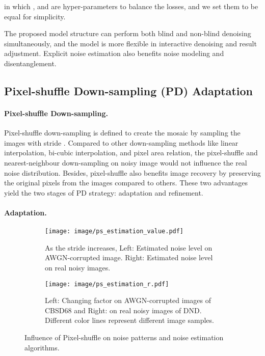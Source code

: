\documentclass[letterpaper]{article} \usepackage{aaai20}  \usepackage{times}  \usepackage{helvet} \usepackage{courier}  \usepackage{comment}
\begin{document}
in which ,  and  are hyper-parameters to balance the losses, and we set them to be equal for simplicity. 

The proposed model structure can perform both blind and non-blind denoising simultaneously, and the model is more flexible in interactive denoising and result adjustment. Explicit noise estimation also benefits noise modeling and disentanglement.  

\subsection{Pixel-shuffle Down-sampling (PD) Adaptation} 
\paragraph{Pixel-shuffle Down-sampling.} 
Pixel-shuffle \cite{shi2016real} down-sampling is defined to create the mosaic by sampling the images with stride . Compared to other down-sampling methods like linear interpolation, bi-cubic interpolation, and pixel area relation, the pixel-shuffle and nearest-neighbour down-sampling on noisy image would not influence the real noise distribution. Besides, pixel-shuffle also benefits image recovery by preserving the original pixels from the images compared to others. These two advantages yield the two stages of PD strategy: adaptation and refinement.
\paragraph{Adaptation.} 

\begin{figure}[t]
	\centering
	\begin{subfigure}[t]{\linewidth} 
		\texttt{[image: image/ps\_estimation\_value.pdf]}
		\caption{ As the stride increases, Left: Estimated noise level on AWGN-corrupted image. Right: Estimated noise level on real noisy images. } \end{subfigure}
	\begin{subfigure}[t]{\linewidth} 
		\texttt{[image: image/ps\_estimation\_r.pdf]}
		\caption{Left: Changing factor  on AWGN-corrupted images of CBSD68 and Right: on real noisy images of DND. Different color lines represent different image samples.} \end{subfigure}
	\caption{Influence of Pixel-shuffle on noise patterns and noise estimation algorithms.}
	\label{fig:ps_est}
\end{figure}
\end{document}
